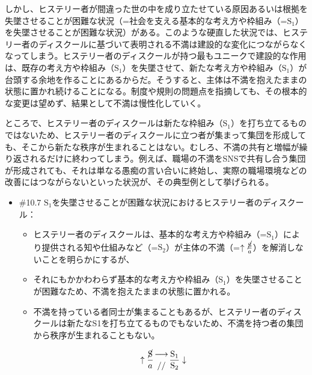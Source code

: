 しかし、ヒステリー者が間違った世の中を成り立たせている原因あるいは根拠を失墜させることが困難な状況（=社会を支える基本的な考え方や枠組み（=\(\textrm{S}_1\)）を失墜させることが困難な状況）がある。このような硬直した状況では、\mbox{ヒステリー者のディスクール}に基づいて表明される不満は建設的な変化につながらなくなってしまう。\mbox{ヒステリー者のディスクール}が持つ最もユニークで建設的な作用は、既存の考え方や枠組み（\(\textrm{S}_1\)）を失墜させて、新たな考え方や枠組み（\(\textrm{S}_1\)）が台頭する余地を作ることにあるからだ。そうすると、主体は不満を抱えたままの状態に置かれ続けることになる。制度や規則の問題点を指摘しても、その根本的な変更は望めず、結果として不満は慢性化していく。

ところで、\mbox{ヒステリー者のディスクール}は新たな枠組み（\(\textrm{S}_1\)）を打ち立てるものではないため、\mbox{ヒステリー者のディスクール}に立つ者が集まって集団を形成しても、そこから新たな秩序が生まれることはない。むしろ、不満の共有と増幅が繰り返されるだけに終わってしまう。例えば、職場の不満をSNSで共有し合う集団が形成されても、それは単なる愚痴の言い合いに終始し、実際の職場環境などの改善にはつながらないといった状況が、その典型例として挙げられる。

\begin{note}{}
  \begin{itemize}
    \tightlist
    \item{\#10.7}
      $\textrm{S}_1$を失墜させることが困難な状況における\mbox{ヒステリー者のディスクール}：
      \begin{itemize}
          \tightlist
          \item
          \mbox{ヒステリー者のディスクール}は、基本的な考え方や枠組み（=$\textrm{S}_1$）により提供される知や仕組みなど（=$\textrm{S}_2$）が主体の不満（=$\uparrow\frac{\cancel{\textrm{S}}}{a}$）を解消しないことを明らかにするが、
          \item
          それにもかかわわらず基本的な考え方や枠組み（$\textrm{S}_1$）を失墜させることが困難なため、不満を抱えたままの状態に置かれる。
          \item
          不満を持っている者同士が集まることもあるが、\mbox{ヒステリー者のディスクール}は新たなS1を打ち立てるものでもないため、不満を持つ者の集団から秩序が生まれることもない。
        \end{itemize}

$$
\uparrow\frac{\cancel{\textrm{S}}}{a}\genfrac{}{}{0pt}{}{\longrightarrow}{//}\frac{\mathrm{S_1}}{\mathrm{S_2}}\downarrow
$$
  \end{itemize}
\end{note}

